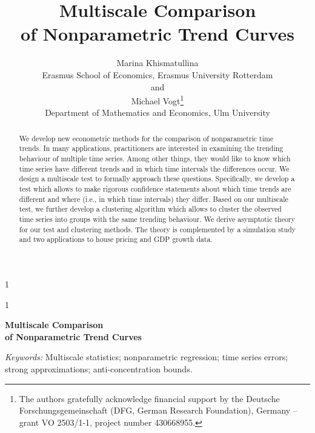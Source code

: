 \documentclass[12pt]{article}
\newcommand{\blind}{1}
\begin{document}
\def\spacingset#1{\renewcommand{\baselinestretch}%
{#1}\small\normalsize} \spacingset{1}

\blind
{
  \title{\bf Multiscale Comparison \\[0.1cm] of Nonparametric Trend Curves}
  \author{Marina Khismatullina\\ Erasmus School of Economics, Erasmus University Rotterdam\\
  and \\
  Michael Vogt\thanks{
  The authors gratefully acknowledge financial support by the Deutsche Forschungsgemeinschaft 
  (DFG, German Research Foundation), Germany – grant VO 2503/1-1, project number 430668955.}
  \hspace{.2cm}\\
  Department of Mathematics and Economics, Ulm University}
  \maketitle
} \fi

\blind
{
  \bigskip
  \bigskip
  \bigskip
  \begin{center}
    {\LARGE\bf Multiscale Comparison \\[0.3cm] of Nonparametric Trend Curves}
\end{center}
  \medskip
} \fi

\bigskip
\begin{abstract}
{\noindent We develop new econometric methods for the comparison of nonparametric time trends. In many applications, practitioners are interested in examining the trending behaviour of multiple time series. Among other things, they would like to know which time series have different trends and in which time intervals the differences occur. We design a multiscale test to formally approach these questions. Specifically, we develop a test which allows to make rigorous confidence statements about which time trends are different and where (i.e., in which time intervals) they differ. Based on our multiscale test, we further develop a clustering algorithm which allows to cluster the observed time series into groups with the same trending behaviour. We derive asymptotic theory for our test and clustering methods. The theory is complemented by a simulation study and two applications to house pricing and GDP growth data.}
\end{abstract}

\noindent%
{\it Keywords:} Multiscale statistics; nonparametric regression; time series errors; strong approximations; anti-concentration bounds.
\vfill
\end{document}
